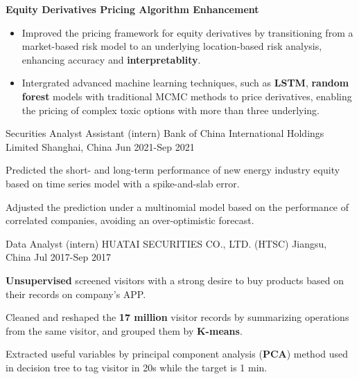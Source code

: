 \begin{cventries}
{\begin{cvitems}
\begin{itemize}
        \end{itemize}
        \item \textbf{Equity Derivatives Pricing Algorithm Enhancement}
        \begin{itemize}
          \item Improved the pricing framework for equity derivatives by transitioning from a market-based risk model to an underlying location-based risk analysis, enhancing accuracy and \textbf{interpretablity}.
          \item Intergrated advanced machine learning techniques, such as \textbf{LSTM}, \textbf{random forest} models with traditional MCMC methods to price derivatives, enabling the pricing of complex toxic options with more than three underlying.
        \end{itemize}
      \end{cvitems}
    }
    \vspace{1.0em}

  \cventry
    {Securities Analyst Assistant (intern)} %
    {Bank of China International Holdings Limited} %
    {Shanghai, China} %
    {Jun 2021-Sep 2021} %
    {
      \begin{cvitems} %
        \item {Predicted the short- and long-term performance of new energy industry equity based on time series model with a spike-and-slab error.}
        \item {Adjusted the prediction under a multinomial model based on the performance of correlated companies, avoiding an over-optimistic forecast.}
      \end{cvitems}
    }
    \vspace{1.5em}
  \cventry
    {Data Analyst (intern)} %
    {HUATAI SECURITIES CO., LTD. (HTSC)} %
    {Jiangsu, China} %
    {Jul 2017-Sep 2017} %
    {
      \begin{cvitems} %
        \item {\textbf{Unsupervised} screened visitors with a strong desire to buy products based on their records on company’s APP.}
        \item {Cleaned and reshaped the \textbf{17 million} visitor records by summarizing operations from the same visitor, and grouped them by \textbf{K-means}.}
        \item {Extracted useful variables by principal component analysis (\textbf{PCA}) method used in decision tree to tag visitor in 20s while the target is 1 min.}
      \end{cvitems}
    }



\end{cventries}
